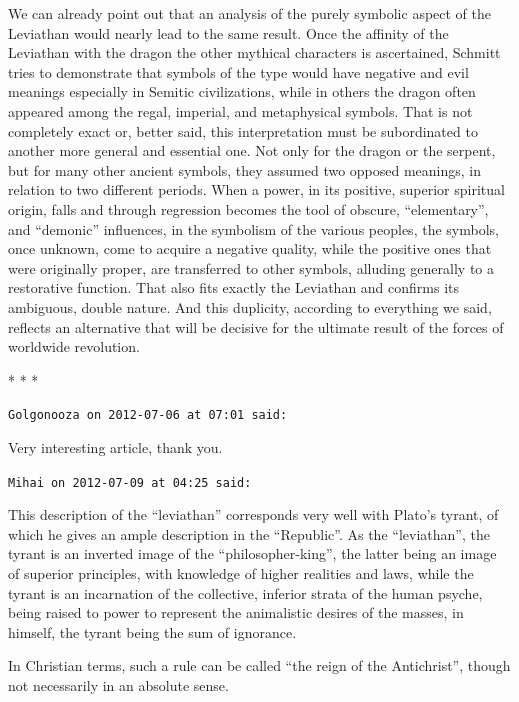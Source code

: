 We can already point out that an analysis of the purely symbolic aspect of the Leviathan would nearly lead to the same result. Once the affinity of the Leviathan with the dragon the other mythical characters is ascertained, Schmitt tries to demonstrate that symbols of the type would have negative and evil meanings especially in Semitic civilizations, while in others the dragon often appeared among the regal, imperial, and metaphysical symbols. That is not completely exact or, better said, this interpretation must be subordinated to another more general and essential one. Not only for the dragon or the serpent, but for many other ancient symbols, they assumed two opposed meanings, in relation to two different periods. When a power, in its positive, superior spiritual origin, falls and through regression becomes the tool of obscure, ``elementary'', and ``demonic'' influences, in the symbolism of the various peoples, the symbols, once unknown, come to acquire a negative quality, while the positive ones that were originally proper, are transferred to other symbols, alluding generally to a restorative function. That also fits exactly the Leviathan and confirms its ambiguous, double nature. And this duplicity, according to everything we said, reflects an alternative that will be decisive for the ultimate result of the forces of worldwide revolution.



\begin{center}* * *\end{center}

\begin{footnotesize}
\begin{sffamily}
\texttt{Golgonooza on 2012-07-06 at 07:01 said:}

Very interesting article, thank you.

\hfill

\texttt{Mihai on 2012-07-09 at 04:25 said:}

This description of the ``leviathan'' corresponds very well with Plato's tyrant, of which he gives an ample description in the ``Republic''. As the ``leviathan'', the tyrant is an inverted image of the ``philosopher-king'', the latter being an image of superior principles, with knowledge of higher realities and laws, while the tyrant is an incarnation of the collective, inferior strata of the human psyche, being raised to power to represent the animalistic desires of the masses, in himself, the tyrant being the sum of ignorance.

In Christian terms, such a rule can be called ``the reign of the Antichrist'', though not necessarily in an absolute sense.


\hfill

\end{sffamily}
\end{footnotesize}

